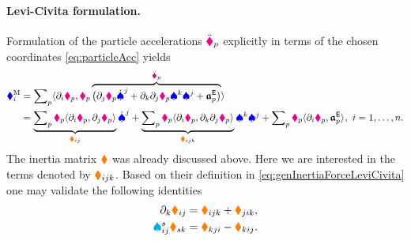 \paragraph{Levi-Civita formulation.}
Formulation of the particle accelerations $\ddot{\boldsymbol{\textcolor{magenta}{\blacklozenge}}}_{p}$ explicitly in terms of the chosen coordinates \eqref{eq:particleAcc} yields
\begin{align}\label{eq:genInertiaForceLeviCivita}
 \textcolor{blue}{\blacklozenge}^{\mathrm{M}}_{i} &= \sum\nolimits_{p} \langle \partial_{i} \boldsymbol{\textcolor{magenta}{\blacklozenge}}_{p}, \textcolor{magenta}{\blacklozenge}_{p} \overbrace{\big(\partial_{j} \boldsymbol{\textcolor{magenta}{\blacklozenge}}_{p} \dot{\textcolor{blue}{\spadesuit}}^{j} + \partial_{k} \partial_{j} \boldsymbol{\textcolor{magenta}{\blacklozenge}}_{p} \textcolor{blue}{\spadesuit}^{k} \textcolor{blue}{\spadesuit}^{j} + \boldsymbol{\mathfrak{a}}_{p}^{\mathsf{E}}\big)}^{\ddot{\boldsymbol{\textcolor{magenta}{\blacklozenge}}}_{p}} \rangle_{}
\\
 &= \underbrace{\sum\nolimits_{p} \textcolor{magenta}{\blacklozenge}_{p} \langle \partial_{i} \boldsymbol{\textcolor{magenta}{\blacklozenge}}_{p}, \partial_{j} \boldsymbol{\textcolor{magenta}{\blacklozenge}}_{p} \rangle_{}}_{\textcolor{orange}{\blacklozenge}_{ij}} \dot{\textcolor{blue}{\spadesuit}}^{j}
 + \underbrace{\sum\nolimits_{p} \textcolor{magenta}{\blacklozenge}_{p} \langle \partial_{i} \boldsymbol{\textcolor{magenta}{\blacklozenge}}_{p}, \partial_{k} \partial_{j} \boldsymbol{\textcolor{magenta}{\blacklozenge}}_{p} \rangle_{}}_{\textcolor{orange}{\blacklozenge}_{ijk}} \textcolor{blue}{\spadesuit}^{k} \textcolor{blue}{\spadesuit}^{j}
 + \sum\nolimits_{p} \textcolor{magenta}{\blacklozenge}_{p} \langle \partial_{i} \boldsymbol{\textcolor{magenta}{\blacklozenge}}_{p}, \boldsymbol{\mathfrak{a}}_{p}^{\mathsf{E}} \rangle_{},
 \
 i = 1,\ldots,n.
\nonumber
\end{align}
The inertia matrix $\boldsymbol{\textcolor{orange}{\blacklozenge}}$ was already discussed above.
Here we are interested in the terms denoted by $\textcolor{orange}{\blacklozenge}_{ijk}$.
Based on their definition in \eqref{eq:genInertiaForceLeviCivita} one may validate the following identities
\begin{subequations}
\begin{align}
 \label{eq:ConnCoeffSymOne}
 \partial_{k} \textcolor{orange}{\blacklozenge}_{ij}
 &= \textcolor{orange}{\blacklozenge}_{ijk} + \textcolor{orange}{\blacklozenge}_{jik},
\\ 
 \label{eq:ConnCoeffSymTwo}
 \textcolor{cyan}{\spadesuit}^{s}_{ij} \textcolor{orange}{\blacklozenge}_{sk}
 &= \textcolor{orange}{\blacklozenge}_{kji} - \textcolor{orange}{\blacklozenge}_{kij}.
\end{align} 
\end{subequations}
